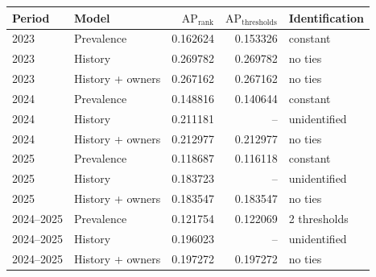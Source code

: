 \begin{tabular}{@{}llrrl@{}}
\toprule
Period & Model & $\mathrm{AP}_{\mathrm{rank}}$ & $\mathrm{AP}_{\mathrm{thresholds}}$ & Identification\\
\midrule
2023 & Prevalence & 0.162624 & 0.153326 & constant\\
2023 & History & 0.269782 & 0.269782 & no ties\\
2023 & History + owners & 0.267162 & 0.267162 & no ties\\
2024 & Prevalence & 0.148816 & 0.140644 & constant\\
2024 & History & 0.211181 & -- & unidentified\\
2024 & History + owners & 0.212977 & 0.212977 & no ties\\
2025 & Prevalence & 0.118687 & 0.116118 & constant\\
2025 & History & 0.183723 & -- & unidentified\\
2025 & History + owners & 0.183547 & 0.183547 & no ties\\
2024--2025 & Prevalence & 0.121754 & 0.122069 & 2 thresholds\\
2024--2025 & History & 0.196023 & -- & unidentified\\
2024--2025 & History + owners & 0.197272 & 0.197272 & no ties\\
\bottomrule
\end{tabular}

